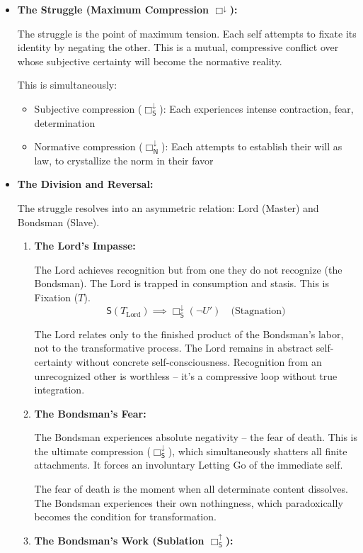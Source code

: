 \documentclass[12pt]{book}
\newcommand{\SBoxUp}{\Box_{\mathsf{S}}^{\uparrow}}
\newcommand{\SBoxDown}{\Box_{\mathsf{S}}^{\downarrow}}
\newcommand{\NBoxDown}{\Box_{\mathsf{N}}^{\downarrow}}
\begin{document}
\begin{itemize}
\item \textbf{The Struggle (Maximum Compression $\Box^{\downarrow}$):}

The struggle is the point of maximum tension. Each self attempts to fixate its identity by negating the other. This is a mutual, compressive conflict over whose subjective certainty will become the normative reality.

This is simultaneously:
\begin{itemize}
\item Subjective compression ($\SBoxDown$): Each experiences intense contraction, fear, determination
\item Normative compression ($\NBoxDown$): Each attempts to establish their will as law, to crystallize the norm in their favor
\end{itemize}

\item \textbf{The Division and Reversal:}

The struggle resolves into an asymmetric relation: Lord (Master) and Bondsman (Slave).

\begin{enumerate}
\item \textbf{The Lord's Impasse:}

The Lord achieves recognition but from one they do not recognize (the Bondsman). The Lord is trapped in consumption and stasis. This is Fixation ($T$).
\[
\mathsf{S}(T_{\text{Lord}}) \implies \SBoxDown(\neg U') \quad \text{(Stagnation)}
\]

The Lord relates only to the finished product of the Bondsman's labor, not to the transformative process. The Lord remains in abstract self-certainty without concrete self-consciousness. Recognition from an unrecognized other is worthless -- it's a compressive loop without true integration.

\item \textbf{The Bondsman's Fear:}

The Bondsman experiences absolute negativity -- the fear of death. This is the ultimate compression ($\SBoxDown$), which simultaneously shatters all finite attachments. It forces an involuntary Letting Go of the immediate self.

The fear of death is the moment when all determinate content dissolves. The Bondsman experiences their own nothingness, which paradoxically becomes the condition for transformation.

\item \textbf{The Bondsman's Work (Sublation $\SBoxUp$):}


\end{enumerate}
\end{itemize}
\end{document}
